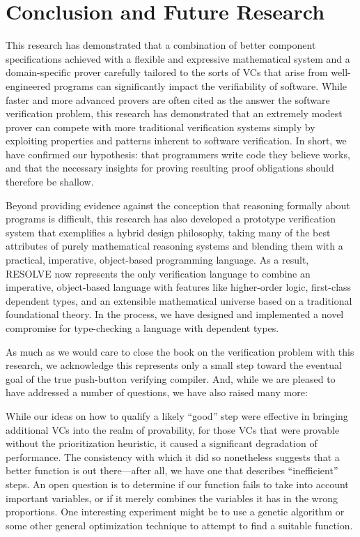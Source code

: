 \chapter{Conclusion and Future Research}\label{ch:conclusion}
This research has demonstrated that a combination of better component specifications achieved with a flexible and expressive mathematical system and a domain-specific prover carefully tailored to the sorts of VCs that arise from well-engineered programs can significantly impact the verifiability of software.  While faster and more advanced provers are often cited as the answer the software verification problem, this research has demonstrated that an extremely modest prover can compete with more traditional verification systems simply by exploiting properties and patterns inherent to software verification.  In short, we have confirmed our hypothesis: that programmers write code they believe works, and that the necessary insights for proving resulting proof obligations should therefore be shallow.

Beyond providing evidence against the conception that reasoning formally about programs is difficult, this research has also developed a prototype verification system that exemplifies a hybrid design philosophy, taking many of the best attributes of purely mathematical reasoning systems and blending them with a practical, imperative, object-based programming language.  As a result, RESOLVE now represents the only verification language to combine an imperative, object-based language with features like higher-order logic, first-class dependent types, and an extensible mathematical universe based on a traditional foundational theory.  In the process, we have designed and implemented a novel compromise for type-checking a language with dependent types.

As much as we would care to close the book on the verification problem with this research, we acknowledge this represents only a small step toward the eventual goal of the true push-button verifying compiler.  And, while we are pleased to have addressed a number of questions, we have also raised many more:

While our ideas on how to qualify a likely ``good'' step were effective in bringing additional VCs into the realm of provability, for those VCs that were provable without the prioritization heuristic, it caused a significant degradation of performance.  The consistency with which it did so nonetheless suggests that a better function is out there---after all, we have one that describes ``inefficient'' steps.  An open question is to determine if our function fails to take into account important variables, or if it merely combines the variables it has in the wrong proportions.  One interesting experiment might be to use a genetic algorithm or some other general optimization technique to attempt to find a suitable function.

